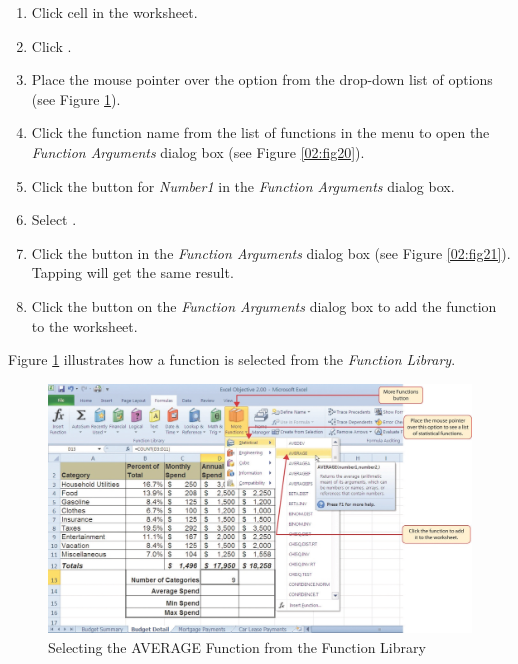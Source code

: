 \begin{enumbox}
	\begin{enumerate}
		\item Click cell  in the  worksheet.
		\item Click .
		\item Place the mouse pointer over the  option from the drop-down list of options (see Figure \ref{02:fig19}).
		\item Click the  function name from the list of functions in the menu to open the \textit{Function Arguments} dialog box (see Figure \ref{02:fig20}).
		\item Click the  button for \textit{Number1} in the \textit{Function Arguments} dialog box.
		\item Select .
		\item Click the  button in the \textit{Function Arguments} dialog box (see Figure \ref{02:fig21}). Tapping  will get the same result.
		\item Click the  button on the \textit{Function Arguments} dialog box to add the  function to the worksheet.
	\end{enumerate}
\end{enumbox}

Figure \ref{02:fig19} illustrates how a function is selected from the  \textit{Function Library}.

\begin{figure}[H]
	\centering
	\includegraphics[width=\maxwidth{.95\linewidth}]{gfx/ch02_fig19}
	\caption{Selecting the AVERAGE Function from the Function Library}
	\label{02:fig19}
\end{figure}

